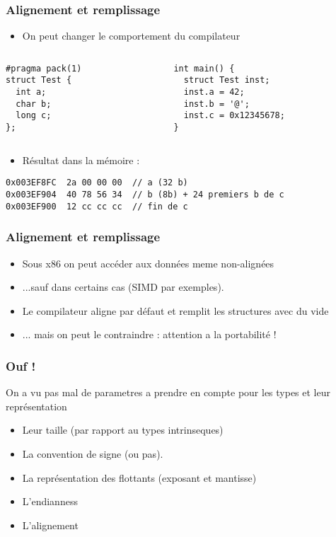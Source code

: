 \documentclass{beamer}
\begin{document}
\begin{frame}[fragile]
\frametitle{Alignement et remplissage}
\begin{itemize}
\item On peut changer le comportement du compilateur 
\end{itemize}
\begin{columns}
  \begin{column}{0.3\textwidth}
\begin{lstlisting}
#pragma pack(1)
struct Test {
  int a;
  char b;
  long c;
};
\end{lstlisting}
  \end{column}
  \begin{column}{0.5\textwidth}
\begin{lstlisting}
int main() {
  struct Test inst;
  inst.a = 42;
  inst.b = '@';
  inst.c = 0x12345678;
}
\end{lstlisting}
  \end{column}
\end{columns}
\pause
\begin{itemize}
\item Résultat dans la mémoire : 
\end{itemize}
\begin{lstlisting}
0x003EF8FC  2a 00 00 00  // a (32 b)  
0x003EF904  40 78 56 34  // b (8b) + 24 premiers b de c 
0x003EF900  12 cc cc cc  // fin de c 
\end{lstlisting}
\end{frame}
\begin{frame}
\frametitle{Alignement et remplissage}
\begin{itemize}
\item Sous x86 on peut accéder aux données meme non-alignées
\item ...sauf dans certains cas (SIMD par exemples).
\item Le compilateur aligne par défaut et remplit les structures avec du vide
\item ... mais on peut le contraindre : attention a la portabilité !
\end{itemize}
\end{frame}

\begin{frame}
\frametitle{Ouf !}
On a vu pas mal de parametres a prendre en compte pour les types et leur représentation
\begin{itemize}
\item Leur taille (par rapport au types intrinseques)
\item La convention de signe (ou pas).
\item La représentation des flottants (exposant et mantisse)
\item L'endianness
\item L'alignement
\end{itemize}
\end{frame}
\end{document}
